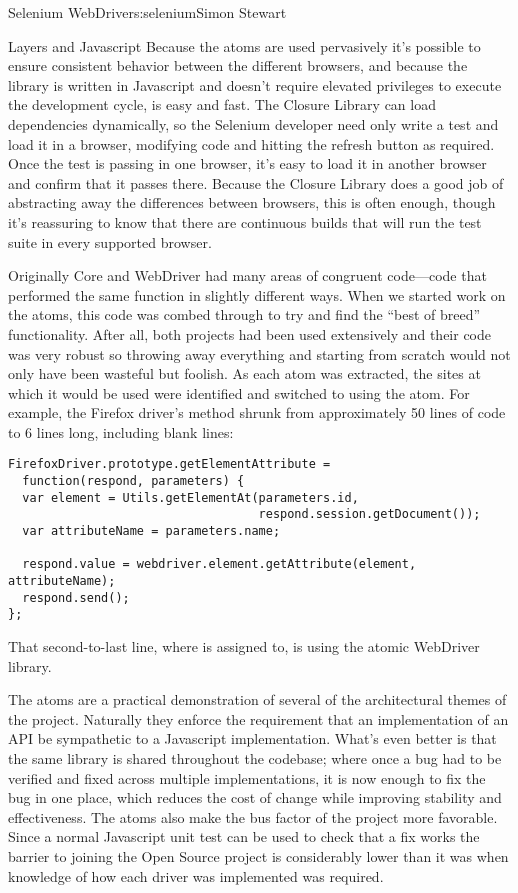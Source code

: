 \begin{aosachapter}{Selenium WebDriver}{s:selenium}{Simon Stewart}
\begin{aosasect1}{Layers and Javascript}
Because the atoms are used pervasively it's possible to ensure
consistent behavior between the different browsers, and because the
library is written in Javascript and doesn't require elevated
privileges to execute the development cycle, is easy and fast. The
Closure Library can load dependencies dynamically, so the Selenium
developer need only write a test and load it in a browser, modifying
code and hitting the refresh button as required. Once the test is
passing in one browser, it's easy to load it in another browser and
confirm that it passes there. Because the Closure Library does a good
job of abstracting away the differences between browsers, this is
often enough, though it's reassuring to know that there are continuous
builds that will run the test suite in every supported browser.

Originally Core and WebDriver had many areas of congruent code---code
that performed the same function in slightly different ways. When we
started work on the atoms, this code was combed through to try and
find the ``best of breed'' functionality. After all, both projects had
been used extensively and their code was very robust so throwing away
everything and starting from scratch would not only have been wasteful
but foolish.  As each atom was extracted, the sites at which it would
be used were identified and switched to using the atom. For example,
the Firefox driver's  method shrunk from
approximately 50 lines of code to 6 lines long, including blank lines:

\begin{verbatim}
FirefoxDriver.prototype.getElementAttribute =
  function(respond, parameters) {
  var element = Utils.getElementAt(parameters.id,
                                   respond.session.getDocument());
  var attributeName = parameters.name;

  respond.value = webdriver.element.getAttribute(element, attributeName);
  respond.send();
};
\end{verbatim}

\noindent That second-to-last line, where  is assigned to,
is using the atomic WebDriver library.

The atoms are a practical demonstration of several of the
architectural themes of the project. Naturally they enforce the
requirement that an implementation of an API be sympathetic to a
Javascript implementation. What's even better is that the same library
is shared throughout the codebase; where once a bug had to be verified
and fixed across multiple implementations, it is now enough to fix the
bug in one place, which reduces the cost of change while improving
stability and effectiveness. The atoms also make the bus factor of the
project more favorable. Since a normal Javascript unit test can be
used to check that a fix works the barrier to joining the Open Source
project is considerably lower than it was when knowledge of how each
driver was implemented was required.


\end{aosasect1}
\end{aosachapter}
